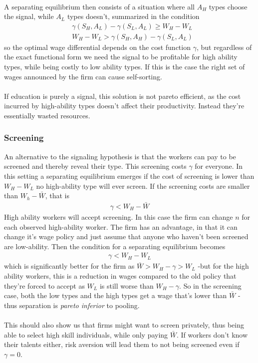 \documentclass[12pt, a4paper]{article}
\begin{document}
\begin{multicols}{2}
\begin{align*}
\end{align*}
A separating equilibrium then consists of a situation where all $A_H$ types choose the signal, while $A_L$ types doesn't, summarized in the condition
\begin{align*}
&\gamma(S_H,A_L)-\gamma(S_L,A_L) \geq W_H - W_L \\ 
&W_H-W_L > \gamma(S_H,A_H)- \gamma(S_L,A_L)
\end{align*}
so the optimal wage differential depends on the cost function $\gamma$, but regardless of the exact functional form we need the signal to be profitable for high ability types, while being costly to low ability types. If this is the case the right set of wages announced by the firm can cause self-sorting.
\\ \\
If education is purely a signal, this solution is not pareto efficient, as the cost incurred by high-ability types doesn't affect their productivity. Instead they're essentially wasted resources.

\subsubsection{Screening}
An alternative to the signaling hypothesis is that the workers can pay to be screened and thereby reveal their type. This screening costs $\gamma$ for everyone. In this setting a separating equilibrium emerges if the cost of screening is lower than $W_H-W_L$ no high-ability type will ever screen. If the screening costs are smaller than $W_h - \bar{W}$, that is 
\begin{align*}
\gamma < W_H - \bar{W}
\end{align*}
High ability workers will accept screening. In this case the firm can change $n$ for each observed high-ability worker. The firm has an advantage, in that it can change it's wage policy and just assume that anyone who haven't been screened are low-ability. Then the condition for a separating equilibrium becomes
\begin{align*}
\gamma < W_H - W_L
\end{align*}
which is significantly better for the firm as $\bar{W}>W_H-\gamma >W_L$ -but for the high ability workers, this is a reduction in wages compared to the old policy that they're forced to accept as $W_L$ is still worse than $W_H- \gamma$. So in the screening case, both the low types and the high types get a wage that's lower than $\bar{W}$ - thus separation is \textit{pareto inferior} to pooling.
\\ \\
This should also show us that firms might want to screen privately, thus being able to select high skill individuals, while only paying $\bar{W}$. If workers don't know their talents either, risk aversion will lead them to not being screened even if $\gamma = 0$.


\end{multicols}
\end{document}
